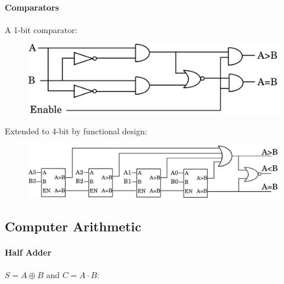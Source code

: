 \documentclass[twocolumn,english]{article}
\begin{document}
\paragraph{Comparators}

A 1-bit comparator:

\begin{figure}[H]
\noindent \centering{}\includegraphics[width=0.2\paperwidth]{img/comparator1}
\end{figure}


Extended to 4-bit by functional design:

\begin{figure}[H]
\noindent \centering{}\includegraphics[width=0.25\paperwidth]{img/comparator4}
\end{figure}



\subsection{Computer Arithmetic}


\paragraph{Half Adder}

$S=A\oplus B$ and $C=A\cdot B$:
\end{document}
